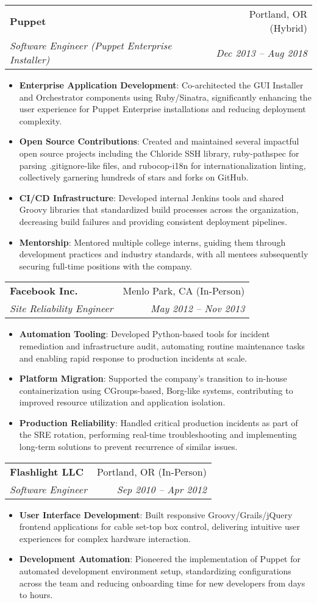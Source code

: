 \documentclass[letterpaper,11pt]{article}
\makeatletter
\newcommand{\resumeItem}[2]{
\item[\textsc{}]\small{
    \textbf{#1}{: #2 \vspace{-2pt}}
  }
}
\newcommand{\resumeSubheading}[4]{
  \vspace{-1pt}\item
    \begin{tabular*}{0.97\textwidth}[t]{l@{\extracolsep{\fill}}r}
      \textbf{#1} & #2 \\
      \textit{\small#3} & \textit{\small #4} \\
    \end{tabular*}\vspace{-5pt}
}
\newcommand{\resumeItemListStart}{\begin{itemize}}
\newcommand{\resumeItemListEnd}{\end{itemize}\vspace{-5pt}}
\makeatother
\begin{document}
    \resumeSubheading
      {Puppet}{Portland, OR (Hybrid)}
      {Software Engineer (Puppet Enterprise Installer)}{Dec 2013 -- Aug 2018}
      \resumeItemListStart
        \resumeItem{Enterprise Application Development}
          {Co-architected the GUI Installer and Orchestrator components using Ruby/Sinatra, significantly enhancing the user experience for Puppet Enterprise installations and reducing deployment complexity.}
        \resumeItem{Open Source Contributions}
          {Created and maintained several impactful open source projects including the Chloride SSH library, ruby-pathspec for parsing .gitignore-like files, and rubocop-i18n for internationalization linting, collectively garnering hundreds of stars and forks on GitHub.}
        \resumeItem{CI/CD Infrastructure}
          {Developed internal Jenkins tools and shared Groovy libraries that standardized build processes across the organization, decreasing build failures and providing consistent deployment pipelines.}
        \resumeItem{Mentorship}
          {Mentored multiple college interns, guiding them through development practices and industry standards, with all mentees subsequently securing full-time positions with the company.}
      \resumeItemListEnd

    \resumeSubheading
      {Facebook Inc.}{Menlo Park, CA (In-Person)}
      {Site Reliability Engineer}{May 2012 -- Nov 2013}
      \resumeItemListStart
        \resumeItem{Automation Tooling}
          {Developed Python-based tools for incident remediation and infrastructure audit, automating routine maintenance tasks and enabling rapid response to production incidents at scale.}
        \resumeItem{Platform Migration}
          {Supported the company's transition to in-house containerization using CGroups-based, Borg-like systems, contributing to improved resource utilization and application isolation.}
        \resumeItem{Production Reliability}
          {Handled critical production incidents as part of the SRE rotation, performing real-time troubleshooting and implementing long-term solutions to prevent recurrence of similar issues.}
      \resumeItemListEnd

    \resumeSubheading
      {Flashlight LLC}{Portland, OR (In-Person)}
      {Software Engineer}{Sep 2010 -- Apr 2012}
      \resumeItemListStart
        \resumeItem{User Interface Development}
          {Built responsive Groovy/Grails/jQuery frontend applications for cable set-top box control, delivering intuitive user experiences for complex hardware interaction.}
        \resumeItem{Development Automation}
          {Pioneered the implementation of Puppet for automated development environment setup, standardizing configurations across the team and reducing onboarding time for new developers from days to hours.}
      \resumeItemListEnd
\end{document}

